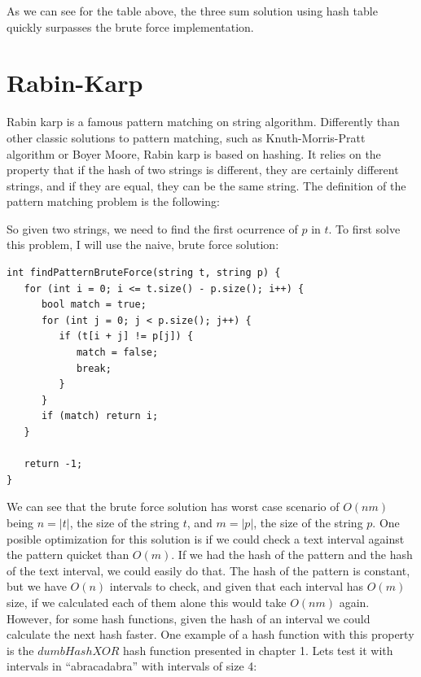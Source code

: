 \bigskip

As we can see for the table above, the three sum solution using hash table quickly surpasses the brute force implementation.

\section{Rabin-Karp}

Rabin karp is a famous pattern matching on string algorithm. Differently than other classic solutions to pattern matching, such as Knuth-Morris-Pratt algorithm or Boyer Moore, Rabin karp is based on hashing. It relies on the property that if the hash of two strings is different, they are certainly different strings, and if they are equal, they can be the same string. The definition of the pattern matching problem is the following:

\medskip


\medskip

So given two strings, we need to find the first ocurrence of \( p \) in \( t \). To first solve this problem, I will use the naive, brute force solution:

\begin{lstlisting}
int findPatternBruteForce(string t, string p) {
   for (int i = 0; i <= t.size() - p.size(); i++) {
      bool match = true;
      for (int j = 0; j < p.size(); j++) {
         if (t[i + j] != p[j]) {
            match = false;
            break;
         }
      }
      if (match) return i;
   }

   return -1;
}
\end{lstlisting}

We can see that the brute force solution has worst case scenario of \( O(nm) \) being \( n = |t| \), the size of the string \( t \), and \( m = |p| \), the size of the string \( p \). One posible optimization for this solution is if we could check a text interval against the pattern quicket than \( O(m) \). If we had the hash of the pattern and the hash of the text interval, we could easily do that. The hash of the pattern is constant, but we have \( O(n) \) intervals to check, and given that each interval has \( O(m) \) size, if we calculated each of them alone this would take \( O(nm) \) again. However, for some hash functions, given the hash of an interval we could calculate the next hash faster. One example of a hash function with this property is the \( dumbHashXOR \) hash function presented in chapter 1. Lets test it with intervals in ``abracadabra'' with intervals of size 4:


